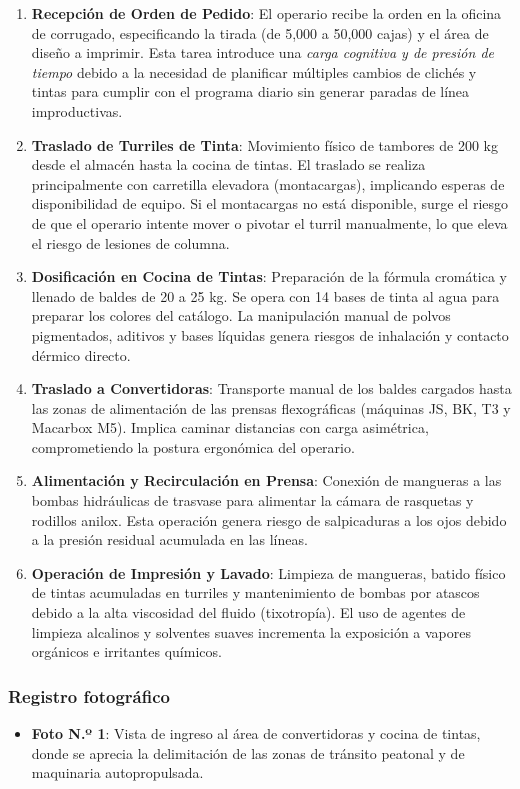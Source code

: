 \documentclass[11pt, letterpaper]{article}
\begin{document}
\begin{enumerate}
    \item \textbf{Recepción de Orden de Pedido}: El operario recibe la orden en la oficina de corrugado, especificando la tirada (de 5,000 a 50,000 cajas) y el área de diseño a imprimir. Esta tarea introduce una \textit{carga cognitiva y de presión de tiempo} debido a la necesidad de planificar múltiples cambios de clichés y tintas para cumplir con el programa diario sin generar paradas de línea improductivas.
    \item \textbf{Traslado de Turriles de Tinta}: Movimiento físico de tambores de 200 kg desde el almacén hasta la cocina de tintas. El traslado se realiza principalmente con carretilla elevadora (montacargas), implicando esperas de disponibilidad de equipo. Si el montacargas no está disponible, surge el riesgo de que el operario intente mover o pivotar el turril manualmente, lo que eleva el riesgo de lesiones de columna.
    \item \textbf{Dosificación en Cocina de Tintas}: Preparación de la fórmula cromática y llenado de baldes de 20 a 25 kg. Se opera con 14 bases de tinta al agua para preparar los colores del catálogo. La manipulación manual de polvos pigmentados, aditivos y bases líquidas genera riesgos de inhalación y contacto dérmico directo.
    \item \textbf{Traslado a Convertidoras}: Transporte manual de los baldes cargados hasta las zonas de alimentación de las prensas flexográficas (máquinas JS, BK, T3 y Macarbox M5). Implica caminar distancias con carga asimétrica, comprometiendo la postura ergonómica del operario.
    \item \textbf{Alimentación y Recirculación en Prensa}: Conexión de mangueras a las bombas hidráulicas de trasvase para alimentar la cámara de rasquetas y rodillos anilox. Esta operación genera riesgo de salpicaduras a los ojos debido a la presión residual acumulada en las líneas.
    \item \textbf{Operación de Impresión y Lavado}: Limpieza de mangueras, batido físico de tintas acumuladas en turriles y mantenimiento de bombas por atascos debido a la alta viscosidad del fluido (tixotropía). El uso de agentes de limpieza alcalinos y solventes suaves incrementa la exposición a vapores orgánicos e irritantes químicos.
\end{enumerate}

\subsubsection{Registro fotográfico}
\begin{itemize}
    \item \textbf{Foto N.º 1}: Vista de ingreso al área de convertidoras y cocina de tintas, donde se aprecia la delimitación de las zonas de tránsito peatonal y de maquinaria autopropulsada.
\end{itemize}
\end{document}
